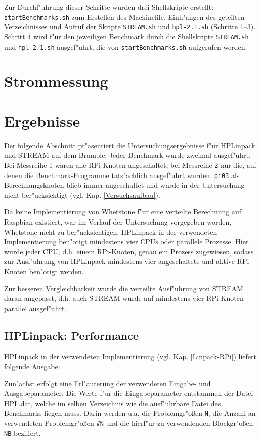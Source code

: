 \noindent
Zur Durchf"uhrung dieser Schritte wurden drei Shellskripte erstellt: \texttt{startBenchmarks.sh} zum Erstellen des Machinefile, Einh"angen des geteilten Verzeichnisses und Aufruf der Skripte \texttt{STREAM.sh} und \texttt{hpl-2.1.\-sh} (Schritte 1--3). Schritt 4 wird f"ur den jeweiligen Benchmark durch die Shellskripte \texttt{STREAM.sh} und \texttt{hpl-2.1.sh} ausgef"uhrt, die von \texttt{startBenchmarks.sh} aufgerufen werden. 

\section{Strommessung}

\section{Ergebnisse}\label{Ergebnisse}

Der folgende Abschnitt pr"asentiert die Untersuchungsergebnisse f"ur HPLinpack und STREAM auf dem Bramble. Jeder Benchmark wurde zweimal ausgef"uhrt. Bei Messreihe 1 waren alle RPi-Knoten angeschaltet, bei Messreihe 2 nur die, auf denen die Benchmark-Programme tats"achlich ausgef"uhrt wurden. \texttt{pi03} als Berechnungsknoten blieb immer angeschaltet und wurde in der Untersuchung nicht ber"ucksichtigt (vgl. Kap. \ref{Versuchsaufbau}).

Da keine Implementierung von Whetstone f"ur eine verteilte Berechnung auf Raspbian existiert, war im Verlauf der Untersuchung vorgegeben worden, Whetstone nicht zu ber"ucksichtigen. HPLinpack in der verwendeten Implementierung ben"otigt mindestens vier CPUs oder parallele Prozesse. Hier wurde jeder CPU, d.h. einem RPi-Knoten, genau ein Prozess zugewiesen, sodass zur Ausf"uhrung von HPLinpack mindestens vier angeschaltete und aktive RPi-Knoten ben"otigt werden. 

Zur besseren Vergleichbarkeit wurde die verteilte Ausf"uhrung von STREAM daran angepasst, d.h. auch STREAM wurde auf mindestens vier RPi-Knoten parallel ausgef"uhrt. 

\subsection{HPLinpack: Performance}\label{Ergebnisse-HPL}

HPLinpack in der verwendeten Implementierung (vgl. Kap. \ref{Linpack-RPi}) liefert folgende Ausgabe:

Zun"achst erfolgt eine Erl"auterung der verwendeten Eingabe- und Ausgabeparameter. Die Werte f"ur die Eingabeparameter entstammen der Datei HPL.dat, welche im selben Verzeichnis wie die ausf"uhrbare Datei des Benchmarks liegen muss. Darin werden u.a. die Problemgr"o\ss en \texttt{N}, die Anzahl an verwendeten Problemgr"o\ss en \texttt{\#N} und die hierf"ur zu verwendenden Blockgr"o\ss en \texttt{NB} beziffert.

